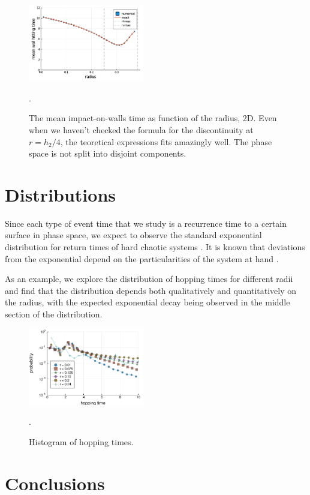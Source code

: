 \documentclass[superscriptaddress,pre,reprint,showpacs,twocolumn]{revtex4-1}
\begin{document}
\begin{figure}[h]
  \centering
  \includegraphics[width=0.45\textwidth]{./figures/wall3d.pdf}
  \caption{The mean impact-on-walls time as function of the radius, 2D.
    Even when we haven't checked the formula for
    the discontinuity at $r=h_2/4$, the teoretical expressions fits
    amazingly well. The phase space is not split into disjoint components.}
    \label{wall3d}.
\end{figure}


%
\section{Distributions}

Since each type of event time that we study is a recurrence time to a
certain surface in phase space, we expect to observe the standard
exponential distribution for return times of hard chaotic systems
\cite{Hirata1999}. It is known that deviations from the
exponential depend on the particularities of the system at hand
\cite{Altmann2005}.


As an example, we explore
the distribution of hopping times for different radii and find that the
distribution depends both qualitatively and quantitatively on the
radius, with the expected exponential decay being observed in the middle section
of the distribution. 


\begin{figure}[h]
  \centering
  \includegraphics[width=0.45\textwidth]{figures/histogram_hopping_times.pdf}
  \caption{Histogram of hopping times.}
    \label{histogram_hopping}.
\end{figure}


\section{Conclusions}
\end{document}
